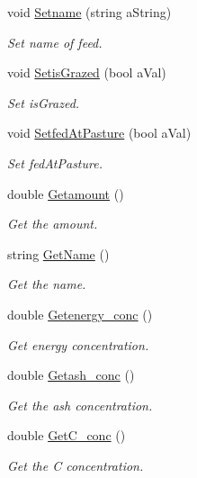 \begin{DoxyCompactItemize}
void \mbox{\hyperlink{classfeed_item_adb5ed4f3fb13af47befd3c63d5005405}{Setname}} (string a\+String)
\begin{DoxyCompactList}\small\item\em Set name of feed. \end{DoxyCompactList}\item 
void \mbox{\hyperlink{classfeed_item_aaaed481d4af8ab0cb4a06983efcaa08c}{Setis\+Grazed}} (bool a\+Val)
\begin{DoxyCompactList}\small\item\em Set is\+Grazed. \end{DoxyCompactList}\item 
void \mbox{\hyperlink{classfeed_item_a2274207440dcfc25d1a839153bd3f7ff}{Setfed\+At\+Pasture}} (bool a\+Val)
\begin{DoxyCompactList}\small\item\em Set fed\+At\+Pasture. \end{DoxyCompactList}\item 
double \mbox{\hyperlink{classfeed_item_a47e35416c30d0a2ab76f3b4c739dd07c}{Getamount}} ()
\begin{DoxyCompactList}\small\item\em Get the amount. \end{DoxyCompactList}\item 
string \mbox{\hyperlink{classfeed_item_a16577e5c3903fae1efc1449bbe7e33b9}{Get\+Name}} ()
\begin{DoxyCompactList}\small\item\em Get the name. \end{DoxyCompactList}\item 
double \mbox{\hyperlink{classfeed_item_ada32a85ac5816c09adeca9e757e666e8}{Getenergy\+\_\+conc}} ()
\begin{DoxyCompactList}\small\item\em Get energy concentration. \end{DoxyCompactList}\item 
double \mbox{\hyperlink{classfeed_item_a2250428bfac6980e46db357f192d979e}{Getash\+\_\+conc}} ()
\begin{DoxyCompactList}\small\item\em Get the ash concentration. \end{DoxyCompactList}\item 
double \mbox{\hyperlink{classfeed_item_a9661e73c167e27fd0e1b78fbb9bbe9bc}{Get\+C\+\_\+conc}} ()
\begin{DoxyCompactList}\small\item\em Get the C concentration. \end{DoxyCompactList}\item 

\end{DoxyCompactItemize}
